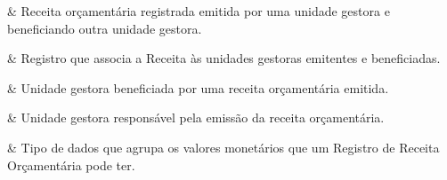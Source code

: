  &
Receita orçamentária registrada emitida por uma unidade gestora e beneficiando outra unidade gestora. 
\\ \hline

 &
Registro que associa a Receita às unidades gestoras emitentes e beneficiadas. 
\\ \hline

 &
Unidade gestora beneficiada por uma receita orçamentária emitida. 
\\ \hline

 &
Unidade gestora responsável pela emissão da receita orçamentária. 
\\ \hline

 &
Tipo de dados que agrupa os valores monetários que um Registro de Receita Orçamentária pode ter. 
\\ \hline
